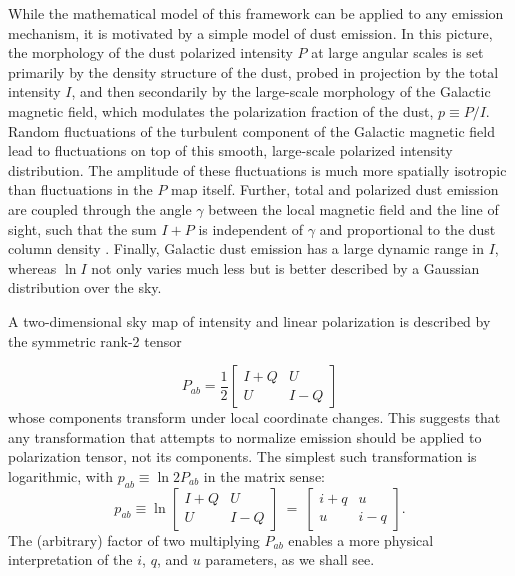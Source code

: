 \documentclass[twocolumn]{aastex631}
\begin{document}
While the mathematical model of this framework can be applied to any emission mechanism, it is motivated by a simple model of dust emission. In this picture, the morphology of the dust polarized intensity $P$ at large angular scales is set primarily by the density structure of the dust, probed in projection by the total intensity $I$, and then secondarily by the large-scale morphology of the Galactic magnetic field, which modulates the polarization fraction of the dust, $p \equiv P/I$. Random fluctuations of the turbulent component of the Galactic magnetic field lead to fluctuations on top of this smooth, large-scale polarized intensity distribution. The amplitude of these fluctuations is much more spatially isotropic than fluctuations in the $P$ map itself. Further, total and polarized dust emission are coupled through the angle $\gamma$ between the local magnetic field and the line of sight, such that the sum $I+P$ is independent of $\gamma$ and proportional to the dust column density \citep{Hensley:2019}. Finally, Galactic dust emission has a large dynamic range in $I$, whereas $\ln I$ not only varies much less but is better described by a Gaussian distribution over the sky.

A two-dimensional sky map of intensity and linear polarization is described by the symmetric rank-2 tensor \citep[e.g.,][]{Landau:1975}

\begin{equation}
    P_{ab} = \frac{1}{2} \left[ \begin{matrix} I+Q & U \\ U & I-Q \end{matrix} \right]
\end{equation}
whose components transform under local coordinate changes. This suggests that any transformation that attempts to normalize emission should be applied to polarization tensor, not its components. The simplest such transformation is logarithmic, with $p_{ab} \equiv \ln 2 P_{ab}$ in the matrix sense:
\begin{equation}\label{eq:logP}
p_{ab} \equiv \ln \left[ \begin{matrix} I+Q & U \\ U & I-Q \end{matrix} \right] \ = \ 
    \left[ \begin{matrix} i+q & u \\ u & i-q \end{matrix} \right].
\end{equation}
The (arbitrary) factor of two multiplying $P_{ab}$ enables a more physical interpretation of the $i$, $q$, and $u$ parameters, as we shall see.
\end{document}
